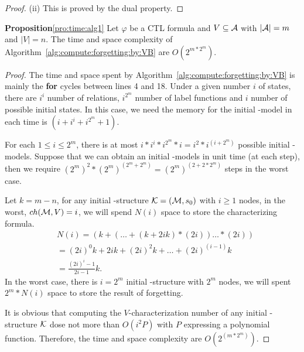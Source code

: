 \documentclass{article}
\begin{document}
\begin{proof}
(ii) This is proved by the dual property.
\end{proof}



\textbf{Proposition}\ref{pro:time:alg1} Let $\varphi$ be a CTL formula and $V\subseteq {\cal A}$  with $|{\cal A}|=m$ and $|V|=n$. The time and space complexity of
Algorithm~\ref{alg:compute:forgetting:by:VB} are $O(2^{m*2^m})$.\\
\begin{proof}
The time and space spent by Algorithm~\ref{alg:compute:forgetting:by:VB} is mainly the \textbf{for} cycles between lines 4 and 18.
Under a given number $i$ of states, there are $i^i$ number of relations, $i^{2^m}$ number of label functions and $i$ number of possible initial states. In this case, we need the memory for the initial \MPK-model in each time is $(i+i^i+i^{2^m}+1)$.

For each $1\leq i \leq 2^m$, there is at most $i*i^i*i^{2^m}*i=i^2*i^{(i+2^m)}$ possible initial \MPK-models.
Suppose that we can obtain an initial \MPK-models in unit time (at each step), then we require $(2^m)^2*(2^m)^{(2^m+2^m)} = (2^m)^{(2+2*2^m)}$ steps in the worst case.

Let $k=m-n$, for any initial \MPK-structure ${\cal K}=({\cal M}, s_0)$ with $i\geq 1$ nodes, in the worst, \ie $ch({\cal M},V)=i$, we will spend $N(i)$ space to store the characterizing formula.
\begin{align*}
 & N(i)=(k+(\dots + (k + 2ik)*(2i))\dots *(2i))\\
 & = (2i)^0k + 2ik + (2i)^2k+ \dots + (2i)^{(i-1)}k\\
 & = \frac{(2i)^i -1}{2i-1} k.
\end{align*}
In the worst case, \ie there is $i=2^m$ initial \MPK-structure with $2^m$ nodes, we will spent $2^m*N(i)$ space to store the result of forgetting.

It is obvious that computing the $V$-characterization number of any initial \MPK-structure $\cal K$ dose not more than $O(i^2P)$ with $P$ expressing a polynomial function.
Therefore, the time and space complexity are $O(2^{(m*2^m)})$.
\end{proof}




\end{document}
